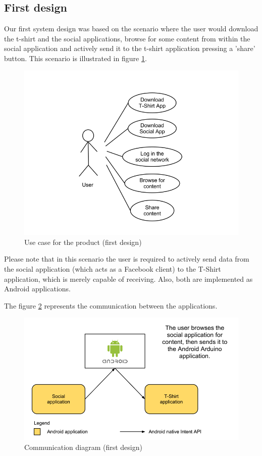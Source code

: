 \subsection{First design}
Our first system design was based on the scenario where the user would download the t-shirt
and the social applications, browse for some content from within the social application
and actively send it to the t-shirt application pressing a 'share' button.
This scenario is illustrated in figure \ref{fig:design-usecase1}.

\begin{figure}[h!]
\centering \includegraphics[scale=0.35]{img/design-usecase1}
\caption{Use case for the product (first design)}
\label{fig:design-usecase1}
\end{figure}

Please note that in this scenario the user is required to actively send data from
the social application (which acts as a Facebook client) to the T-Shirt application,
which is merely capable of receiving. Also, both are implemented as Android applications.

\newpage

The figure \ref{fig:design-resp} represents the communication between the applications.

\begin{figure}[h!]
\centering \includegraphics[scale=0.35]{img/design-resp.png}
\caption{Communication diagram (first design)}
\label{fig:design-resp}
\end{figure}


